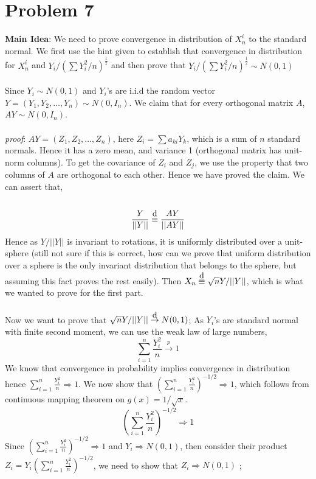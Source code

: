\documentclass{article}
\begin{document}
\section{Problem 7}
\textbf{Main Idea}: We need to prove convergence in distribution of $X_n^i$ to the standard normal. We first use the hint given to establish that convergence in distribution for $X_n^i$ and $Y_i/(\sum Y_i^2 /n)^\frac{1}{2}$ and then prove that $Y_i/(\sum Y_i^2 /n)^\frac{1}{2} \sim N(0, 1)$\\\\
Since $Y_i \sim N(0,1)$ and $Y_i$'s are i.i.d the random vector $Y = (Y_1, Y_2, \dots, Y_n) \sim N(0, I_n)$. We claim that for every orthogonal matrix $A$, $AY \sim N(0, I_n)$.\\\\
\textit{proof}: $AY = (Z_1, Z_2, \dots, Z_n)$, here $Z_i = \sum a_{ki} Y_k$, which is a sum of $n$ standard normals. Hence it has a zero mean, and variance 1 (orthogonal matrix has unit-norm columns). To get the covariance of $Z_i$ and $Z_j$, we use the property that two columns of $A$ are orthogonal to each other. Hence we have proved the claim. We can assert that, \\\\
\[
\frac{Y}{||Y||} \stackrel{\mathclap{\normalfont\mbox{d}}}{\equiv} \frac{AY}{||AY||}
\]
Hence as $Y/||Y||$ is invariant to rotations, it is uniformly distributed over a unit-sphere (still not sure if this is correct, how can we prove that uniform distribution over a sphere is the only invariant distribution that belongs to the sphere, but assuming this fact proves the rest easily). Then $X_n \stackrel{\mathclap{\normalfont\mbox{d}}}{\equiv} \sqrt{n}Y/||Y||$, which is what we wanted to prove for the first part. \\\\
Now we want to prove that $\sqrt{n}Y/||Y|| \stackrel{\mathclap{\normalfont\mbox{d}}}{\rightarrow} N(0, 1)$; As $Y_i$'s are standard normal with finite second moment, we can use the weak law of large numbers, 
\[
\sum_{i=1}^{n} \frac{Y_i^2}{n} \xrightarrow{p} 1
\]
We know that convergence in probability implies convergence in distribution hence $\sum_{i=1}^{n} \frac{Y_i^2}{n} \Rightarrow 1$. We now show that $\left(\sum_{i=1}^{n} \frac{Y_i^2}{n}\right)^{-1/2} \Rightarrow 1$, which follows from continuous mapping theorem on $g(x) = 1/\sqrt{x}$. 
\[
\left(\sum_{i=1}^{n} \frac{Y_i^2}{n}\right)^{-1/2} \Rightarrow 1
\]
Since $\left(\sum_{i=1}^{n} \frac{Y_i^2}{n}\right)^{-1/2} \Rightarrow 1$ and $Y_i \Rightarrow N(0, 1)$, then consider their product $Z_i = Y_i\left(\sum_{i=1}^{n} \frac{Y_i^2}{n}\right)^{-1/2}$, we need to show that $Z_i \Rightarrow N(0, 1)$ ; 
\end{document}
